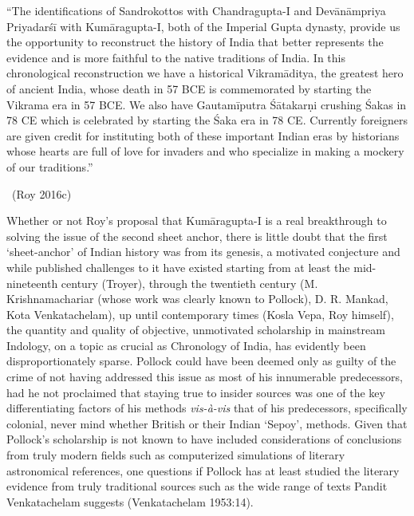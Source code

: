 \begin{myquote}
“The identifications of Sandrokottos with Chandragupta-I and Devānāmpriya Priyadarśī with Kumāragupta-I, both of the Imperial Gupta dynasty, provide us the opportunity to reconstruct the history of India that better represents the evidence and is more faithful to the native traditions of India. In this chronological reconstruction we have a historical Vikramā\-ditya, the greatest hero of ancient India, whose death in 57 BCE is commemorated by starting the Vikrama era in 57 BCE. We also have Gautamīputra Śātakarṇi crushing Śakas in 78 CE which is celebrated by starting the Śaka era in 78 CE. Currently foreigners are given credit for instituting both of these important Indian eras by historians whose hearts are full of love for invaders and who specialize in making a mockery of our traditions.” 

~\hfill (Roy 2016c)
\end{myquote}

Whether or not Roy’s proposal that Kumāragupta-I is a real breakthrough to solving the issue of the second sheet anchor, there is little doubt that the first ‘sheet-anchor’ of Indian history was from its genesis, a motivated conjecture and while published challenges to it have existed starting from at least the mid-nineteenth century (Troyer), through the twentieth century (M. Krishnamachariar (whose work was clearly known to Pollock), D. R. Mankad, Kota Venkatachelam), up until contemporary times (Kosla Vepa, Roy himself), the quantity and quality of objective, unmotivated scholarship in mainstream Indology, on a topic as crucial as Chronology of India, has evidently been disproportionately sparse. Pollock could have been deemed only as guilty of the crime of not having addressed this issue as most of his innumerable predecessors, had he not proclaimed that staying true to insider sources was one of the key differentiating factors of his methods \textit{vis-à-vis} that of his predecessors, specifically colonial, never mind whether British or their Indian ‘Sepoy’, methods. Given that Pollock’s scholarship is not known to have included considerations of conclusions from truly modern fields such as computerized simulations of literary astronomical references, one questions if Pollock has at least studied the literary evidence from truly traditional sources such as the wide range of texts Pandit Venkatachelam suggests (Venkatachelam 1953:14).



